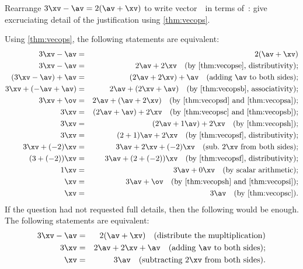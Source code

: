 \begin{example} \label{eg:}
Rearrange \(3\xv-\av=2(\av+\xv)\) to write vector~\xv\ in terms of~\av: give excruciating detail of the justification using \autoref{thm:vecops}.
\begin{solution} 
Using \autoref{thm:vecops}, the following statements are equivalent:
\begin{eqnarray*}
3\xv-\av&=&2(\av+\xv)
\\3\xv-\av&=&2\av+2\xv
\quad(\text{by \ref{thm:vecopse}, distributivity});
\\(3\xv-\av)+\av&=&(2\av+2\xv)+\av
\quad(\text{adding \av\ to both sides});
\\3\xv+(-\av+\av)&=&2\av+(2\xv+\av)
\quad(\text{by \ref{thm:vecopsb}, associativity});
\\3\xv+\ov&=&2\av+(\av+2\xv)
\quad(\text{by \ref{thm:vecopsd} and \ref{thm:vecopsa}});
\\3\xv&=&(2\av+\av)+2\xv
\quad(\text{by \ref{thm:vecopsc} and \ref{thm:vecopsb}});
\\3\xv&=&(2\av+1\av)+2\xv
\quad(\text{by \ref{thm:vecopsh}});
\\3\xv&=&(2+1)\av+2\xv
\quad(\text{by \ref{thm:vecopsf}, distributivity});
\\3\xv+(-2)\xv&=&3\av+2\xv+(-2)\xv
\quad(\text{sub.\ \(2\xv\) from both sides});
\\(3+(-2))\xv&=&3\av+(2+(-2))\xv
\quad(\text{by \ref{thm:vecopsf}, distributivity});
\\1\xv&=&3\av+0\xv
\quad(\text{by scalar arithmetic});
\\\xv&=&3\av+\ov
\quad(\text{by \ref{thm:vecopsh} and \ref{thm:vecopsi}});
\\\xv&=&3\av
\quad(\text{by \ref{thm:vecopsc}}).
\end{eqnarray*}
If the question had not requested full details, then the following would be enough.
The following statements are equivalent:
\begin{eqnarray*}
3\xv-\av&=&2(\av+\xv)
\quad(\text{distribute the mupltiplication})
\\3\xv&=&2\av+2\xv+\av
\quad(\text{adding \av\ to both sides});
\\\xv&=&3\av
\quad(\text{subtracting \(2\xv\) from both sides}).
\end{eqnarray*}
\end{solution}
\end{example}








